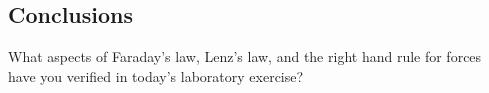 \begin{multicols}{2}
\section{Conclusions}
 What aspects of Faraday's law, Lenz's law, and the \textsf{right hand rule for forces} have you verified in today's laboratory exercise?
 

\end{multicols}
\endinput
